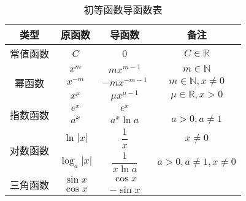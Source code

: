 \begin{table}
    \centering
    \caption{初等函数导函数表}
    \renewcommand\arraystretch{2.2}
    \begin{tabular}{|c|c|c|c|}
        \hline
        类型                        & 原函数                                              & 导函数                       & 备注                                           \\
        \hline
        常值函数                    & $C$                                                 & $0$                          & $C\in \mathbb{R}$                              \\
        \hline
        \multirow{3}{*}{幂函数}     & $x^m$                                               & $mx^{m - 1}$                 & $m \in \mathbb{N}$                             \\
                                    & $x^{-m}$                                            & $-mx^{-m - 1}$               & $m \in \mathbb{N},x \ne 0$                     \\
                                    & $x^\mu$                                             & $\mu x^{\mu - 1}$            & $\mu \in \mathbb{R}, x > 0$                    \\
        \hline
        \multirow{2}{*}{指数函数}   & $e^x$                                               & $e^x$                        &                                                \\
                                    & $a^x$                                               & $a^x\ln a$                   & $a > 0, a \ne 1$                               \\
        \hline
        \multirow{2}{*}{对数函数}   & $\ln |x|$                                           & $\dfrac{1}{x}$               & $x \ne 0$                                      \\[8pt]
                                    & $\log_a|x|$                                         & $\dfrac{1}{x\ln a}$          & $a > 0, a \ne 1, x \ne 0$                      \\[8pt]
        \hline
        \multirow{4}{*}{三角函数}   & $\sin x$                                            & $\cos x$                     &                                                \\
                                    & $\cos x$                                            & $-\sin x$                    &                                                \\

\end{tabular}
\end{table}
